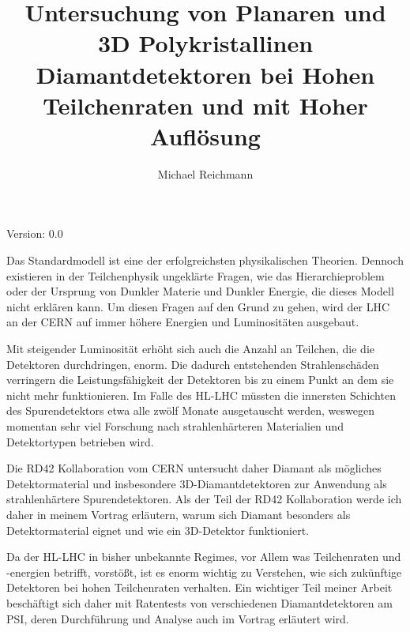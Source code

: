 \documentclass[12pt, a4paper]{article}
\title{Untersuchung von Planaren und 3D Polykristallinen Diamantdetektoren bei Hohen Teilchenraten und mit Hoher Auflösung}
\author{Michael Reichmann}
\institute{Institut für Teilchen- und Astrophysik, Eidgenössische Technische Hochschule Zürich}
\makeatletter
\newcommand*{\@version}{0.0}
\makeatother
\begin{document}
{\flushright Version: \@version\par}
{\large\bfseries\@title\par}
{\scshape\@author\par}
{\slshape\@institute\par}\vspace*{1.5cm}

Das Standardmodell ist eine der erfolgreichsten physikalischen Theorien. Dennoch existieren in der Teilchenphysik ungeklärte Fragen, wie das Hierarchieproblem oder der Ursprung von Dunkler Materie und Dunkler Energie, die dieses Modell nicht erklären kann. Um diesen Fragen auf den Grund zu gehen, wird der \ac{LHC} an der \ac{CERN} auf immer höhere Energien und Luminositäten ausgebaut.\par

Mit steigender Luminosität erhöht sich auch die Anzahl an Teilchen, die die Detektoren durchdringen, enorm. Die dadurch entstehenden Strahlenschäden verringern die Leistungsfähigkeit der Detektoren bis zu einem Punkt an dem sie nicht mehr funktionieren. Im Falle des \ac{HL-LHC} müssten die innersten Schichten des Spurendetektors etwa alle zwölf Monate ausgetauscht werden, weswegen momentan sehr viel Forschung nach strahlenhärteren Materialien und Detektortypen betrieben wird.\par

Die RD42 Kollaboration vom \ac{CERN} untersucht daher Diamant als mögliches Detektormaterial und insbesondere 3D-Diamantdetektoren zur Anwendung als strahlenhärtere Spurendetektoren. Als der Teil der RD42 Kollaboration werde ich daher in meinem Vortrag erläutern, warum sich Diamant besonders als Detektormaterial eignet und wie ein 3D-Detektor funktioniert.\par

Da der \ac{HL-LHC} in bisher unbekannte Regimes, vor Allem was Teilchenraten und -energien betrifft, vorstößt, ist es enorm wichtig zu Verstehen, wie sich zukünftige Detektoren bei hohen Teilchenraten verhalten. Ein wichtiger Teil meiner Arbeit beschäftigt sich daher mit Ratentests von verschiedenen Diamantdetektoren am \ac{PSI}, deren Durchführung und Analyse auch im Vortrag erläutert wird.\par


	
	
	
\end{document}
